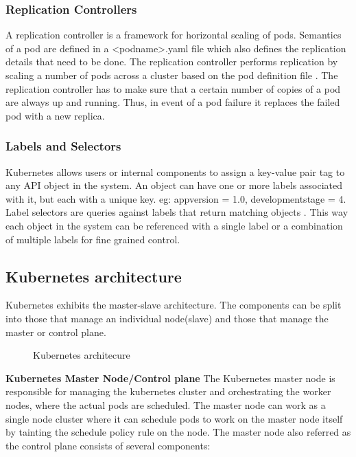 \documentclass[9pt,twocolumn,twoside]{../../styles/osajnl}
\begin{document}
\subsubsection{Replication Controllers}
A replication controller is a framework for horizontal scaling of
pods. Semantics of a pod are defined in a <pod\textunderscore name>.yaml file which
also defines the replication details that need to be done. The
replication controller performs replication by scaling a number of
pods across a cluster based on the pod definition file \cite{www-wiki-kubernetes}. The
replication controller has to make sure that a certain number of
copies of a pod are always up and running. Thus, in event of a pod
failure it replaces the failed pod with a new replica.

\subsubsection{Labels and Selectors}
Kubernetes allows users or internal components to assign a key-value
pair tag to any API object in the system. An object can have one or
more labels associated with it, but each with a unique key. eg:
appversion = 1.0, development\textunderscore stage = 4.  Label selectors are queries
against labels that return matching objects \cite{www-kubernetes-digitalocean}. This way each
object in the system can be referenced with a single label or a
combination of multiple labels for fine grained control.

\subsection{Kubernetes architecture}
Kubernetes exhibits the master-slave architecture. The components can
be split into those that manage an individual node(slave) and those
that manage the master or control plane.

\begin{figure}[htbp]
\centering
{}
\caption{Kubernetes architecure \cite{www-kubernetes-architecture}}
\label{fig:Kubernetes Minimum Architecture}
\end{figure}


\textbf{Kubernetes Master Node/Control plane}
\newline
The Kubernetes master node is responsible for managing the kubernetes
cluster and orchestrating the worker nodes, where the actual pods are
scheduled. The master node can work as a single node cluster where it
can schedule pods to work on the master node itself by tainting the
schedule policy rule on the node. The master node also referred as
the control plane consists of several components:
\end{document}

